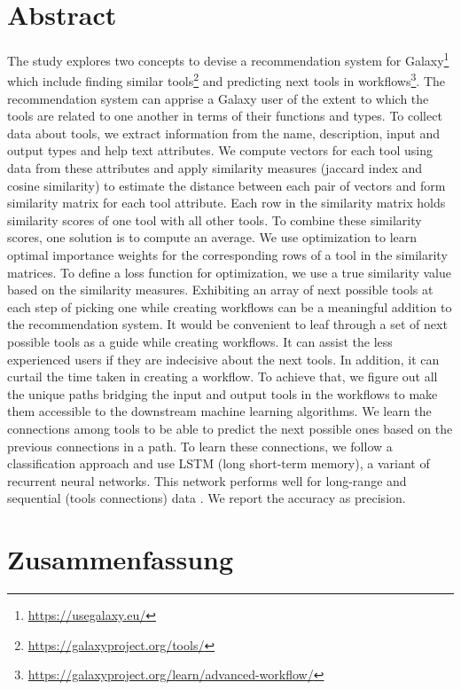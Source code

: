 \chapter*{Abstract}
The study explores two concepts to devise a recommendation system for Galaxy{\footnote{\url{https://usegalaxy.eu/}}} which include finding similar tools{\footnote{\url{https://galaxyproject.org/tools/}}} and predicting next tools in workflows{\footnote{\url{https://galaxyproject.org/learn/advanced-workflow/}}}. The recommendation system can apprise a Galaxy user of the extent to which the tools are related to one another in terms of their functions and types. To collect data about tools, we extract information from the name, description, input and output types and help text attributes. We compute vectors \cite{Foltz1996, DBLP:journals/corr/LeM14} for each tool using data from these attributes and apply similarity measures (jaccard index and cosine similarity) to estimate the distance between each pair of vectors and form similarity matrix for each tool attribute. Each row in the similarity matrix holds similarity scores of one tool with all other tools. To combine these similarity scores, one solution is to compute an average. We use optimization \cite{KaoudiQTCA17} to learn optimal importance weights for the corresponding rows of a tool in the similarity matrices. To define a loss function for optimization, we use a true similarity value based on the similarity measures. Exhibiting an array of next possible tools at each step of picking one while creating workflows can be a meaningful addition to the recommendation system. It would be convenient to leaf through a set of next possible tools as a guide while creating workflows. It can assist the less experienced users if they are indecisive about the next tools. In addition, it can curtail the time taken in creating a workflow. To achieve that, we figure out all the unique paths bridging the input and output tools in the workflows to make them accessible to the downstream machine learning algorithms. We learn the connections among tools to be able to predict the next possible ones based on the previous connections in a path. To learn these connections, we follow a classification approach and use LSTM (long short-term memory), a variant of recurrent neural networks. This network performs well for long-range and sequential (tools connections) data \cite{LiptonKEW15, SakSB14}. We report the accuracy as precision.

\chapter*{Zusammenfassung}


